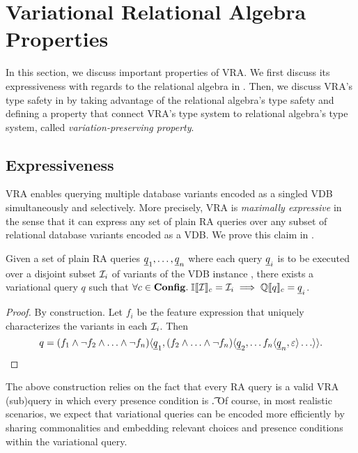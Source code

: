 \section{Variational Relational Algebra Properties}
\label{sec:vqlprop}

In this section, we discuss important properties of VRA. We first discuss its expressiveness
with regards to the relational algebra in .
Then, we discuss VRA's type safety in  by taking advantage of the
relational algebra's type safety and defining a property that connect VRA's type 
system to relational algebra's type system, called \emph{variation-preserving property}.

\subsection{Expressiveness}
\label{sec:express}

VRA enables querying multiple database variants encoded as a singled VDB
simultaneously and selectively.
%
More precisely, VRA is \emph{maximally expressive} in the sense that it can
express any set of plain RA queries over any subset of relational database
variants encoded as a VDB. 
We prove this claim in .

\begin{theorem}
\label{thm:max-expr}
Given a set of plain RA queries $\pQ_1,\ldots,\pQ_n$ where each query $\pQ_i$
is to be executed over a disjoint subset $\vdbInst_i$ of variants of the VDB
instance \vdbInst, there exists a variational query $q$ such that
$\forall \config \in \confSet.\; \odbSem{\vdbInst} = \vdbInst_i \implies \eeSem{\vQ} = \pQ_i$.
\end{theorem}

\begin{proof}
By construction. Let $f_i$ be the feature expression that uniquely
characterizes the variants in each $\vdbInst_i$.
Then 
\[
\vQ =
\chc[(\fName_1\wedge\neg \fName_2\wedge\ldots\wedge\neg \fName_n)]{\pQ_1,
  \chc[(\fName_2\wedge\ldots\wedge\neg \fName_n)]{\pQ_2,\ldots
    \chc[\fName_n]{\pQ_n,\emp}\ldots}}.
\]
\end{proof}

\noindent
%
The above construction relies on the fact that every RA query is a valid VRA
(sub)query in which every presence condition is \t.
%
Of course, in most realistic scenarios, we expect that variational queries can be encoded
more efficiently by sharing commonalities and embedding relevant choices and
presence conditions within the variational query.







